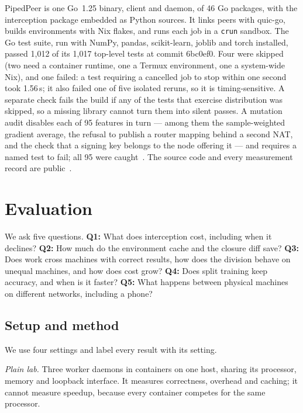 \documentclass[5p,times,twocolumn]{elsarticle}
\begin{document}
PipedPeer is one Go~1.25 binary, client and daemon, of 46 Go packages, with
the interception package embedded as Python sources. It links peers with
quic-go, builds environments with Nix flakes, and runs each job in a
\texttt{crun} sandbox. The Go test suite, run with NumPy, pandas,
scikit-learn, joblib and torch installed, passed 1{,}012 of its 1{,}017
top-level tests at commit 6bc0ef0. Four were skipped (two need a container
runtime, one a Termux environment, one a system-wide Nix), and one failed: a
test requiring a cancelled job to stop within one second took 1.56\,s; it also
failed one of five isolated reruns, so it is timing-sensitive.
A separate
check fails the build if any of the tests that exercise distribution was
skipped, so a missing library cannot turn them into silent passes. A mutation
audit disables each of 95 features in turn --- among them the sample-weighted
gradient average, the refusal to publish a router mapping behind a second NAT,
and the check that a signing key belongs to the node offering it --- and
requires a named test to fail; all 95 were caught~\cite{jia2011mutation}.
The source code and every measurement record are public~\cite{pipedpeerrepo}.

\section{Evaluation}
\label{sec:eval}

We ask five questions.
\textbf{Q1:} What does interception cost, including when it declines?
\textbf{Q2:} How much do the environment cache and the closure diff save?
\textbf{Q3:} Does work cross machines with correct results, how does the
division behave on unequal machines, and how does cost grow?
\textbf{Q4:} Does split training keep accuracy, and when is it faster?
\textbf{Q5:} What happens between physical machines on different networks,
including a phone?

\subsection{Setup and method}
\label{sec:setup}

We use four settings and label every result with its setting.

\emph{Plain lab.} Three worker daemons in containers on one host, sharing its
processor, memory and loopback interface. It measures correctness, overhead
and caching; it cannot measure speedup, because every container competes for
the same processor.
\end{document}
